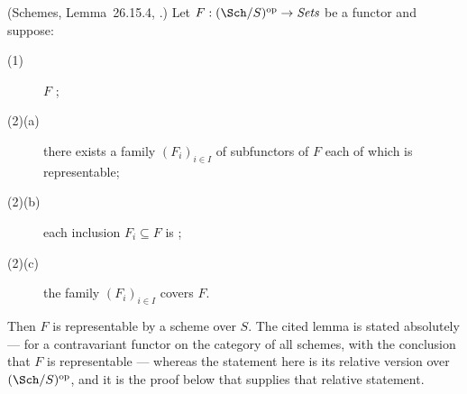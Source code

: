 \begin{lemma}
\label{lem:pc-schemes-criterion}
(Schemes, Lemma~26.15.4,
.)  Let
$F:(\Sch/S)^{\mathrm{op}}\to\textit{Sets}$ be a functor and suppose:
\begin{description}
\item[(1)] $F$ ;
\item[(2)(a)] there exists a family $(F_i)_{i\in I}$ of subfunctors of
$F$ each of which is representable;
\item[(2)(b)] each inclusion $F_i\subseteq F$ is
;
\item[(2)(c)] the family $(F_i)_{i\in I}$ covers $F$.
\end{description}
Then $F$ is representable by a scheme over $S$.
The cited lemma is stated absolutely --- for a contravariant functor on the
category of all schemes, with the conclusion that $F$ is representable ---
whereas the statement here is its relative version over
$(\Sch/S)^{\mathrm{op}}$, and it is the proof below that supplies that
relative statement.
\end{lemma}
